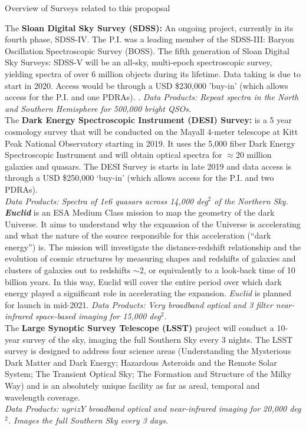 \documentclass[11pt,a4paper]{article}
\begin{document}
\begin{framed}
\begin{center}
  Overview of Surveys related to this propopsal
\end{center}

The {\bf Sloan Digital Sky Survey (SDSS):} An ongoing project, currently in its fourth phase, SDSS-IV.  
The P.I. was a leading member of the SDSS-III: Baryon Oscillation Spectroscopic Survey (BOSS). 
The fifth generation of Sloan Digital Sky Surveys: SDSS-V will be an all-sky, multi-epoch spectroscopic 
survey, yielding spectra of over 6 million objects during its lifetime. Data taking is due to start in 
2020. Access would be through a USD \$230,000 'buy-in' (which allows access for the P.I. and one PDRAs).  . 
{\it Data Products: Repeat spectra in the North and Southern Hemisphere for 500,000 bright QSOs.} \\

The {\bf Dark Energy Spectroscopic Instrument (DESI) Survey:} is a 5 year cosmology survey 
that will be conducted on the Mayall 4-meter telescope at Kitt Peak National Observatory starting 
in 2019. It uses the 5,000 fiber Dark Energy Spectroscopic Instrument and will obtain optical 
spectra for $\approx$20 million galaxies and quasars. The DESI Survey is starts in late 2019 
and data access is through a USD \$250,000 `buy-in' (which allows access for the P.I. and two PDRAs).  \\
{\it Data Products: Spectra of 1e6 quasars across 14,000 deg$^{2}$ of the Northern Sky.} \\

\textit{\textbf{Euclid}} is an ESA Medium Class mission to map the geometry of the dark Universe.
It aims to understand why the expansion of the Universe is accelerating and what the nature 
of the source responsible for this acceleration (``dark energy'') is. 
The
mission will investigate the distance-redshift relationship and the
evolution of cosmic structures by measuring shapes and redshifts of
galaxies and clusters of galaxies out to redshifts $\sim$2, or equivalently
to a look-back time of 10 billion years. In this way, Euclid will
cover the entire period over which dark energy played a significant
role in accelerating the expansion.
{\it Euclid} is planned for launch in mid-2021. 
{\it Data Products: Very broadband optical and 3 filter near-infrared space-based imaging for 15,000 deg$^2$.} \\

The {\bf Large Synoptic Survey Telescope (LSST)} project will conduct
a 10-year survey of the sky, imaging the full Southern Sky every 3
nights. The LSST survey is designed to address four science areas
(Understanding the Mysterious Dark Matter and Dark Energy; Hazardous
Asteroids and the Remote Solar System; The Transient Optical Sky; The
Formation and Structure of the Milky Way) and is an absolutely unique
facility as far as areal, temporal and wavelength coverage.\\
{\it Data Products: $ugrizY$ broadband optical and near-infrared imaging for 20,000 deg$^2$. 
Images the full Southern Sky every 3 days. } \\


\end{framed}
\end{document}

